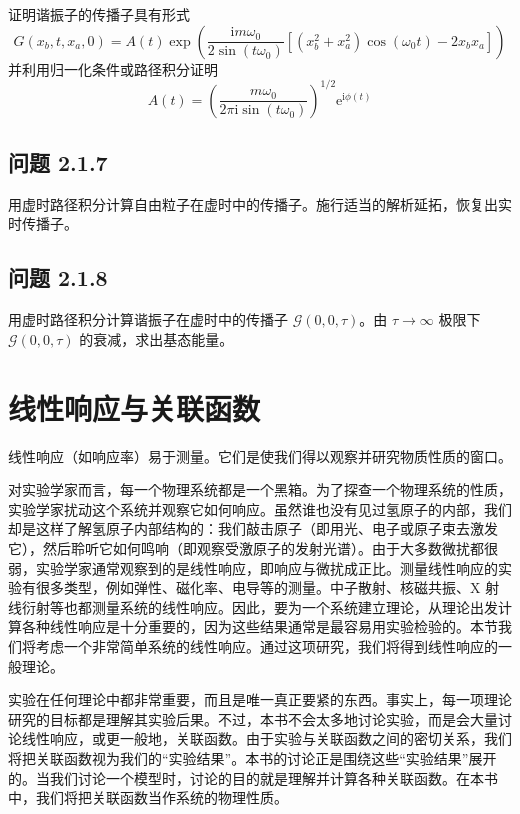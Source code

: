 证明谐振子的传播子具有形式
\begin{equation*}
G(x_b,t,x_a,0)=A(t)\exp\left(\frac{\mathrm{i}m\omega_0}{2\sin(t\omega_0)}\left[(x_b^2+x_a^2)\cos(\omega_0 t)-2x_bx_a\right]\right)
\end{equation*}
并利用归一化条件或路径积分证明
\begin{equation*}
A(t)=\left(\frac{m\omega_0}{2\pi\mathrm{i}\sin(t\omega_0)}\right)^{1/2}\mathrm{e}^{\mathrm{i}\phi(t)}
\end{equation*}

\subsection*{问题 2.1.7}

用虚时路径积分计算自由粒子在虚时中的传播子。施行适当的解析延拓，恢复出实时传播子。

\subsection*{问题 2.1.8}

用虚时路径积分计算谐振子在虚时中的传播子 $\mathcal{G}(0,0,\tau)$。由 $\tau\to\infty$ 极限下 $\mathcal{G}(0,0,\tau)$ 的衰减，求出基态能量。

\section{线性响应与关联函数}

\begin{keypoints}
\item 线性响应（如响应率）易于测量。它们是使我们得以观察并研究物质性质的窗口。
\end{keypoints}

对实验学家而言，每一个物理系统都是一个黑箱。为了探查一个物理系统的性质，实验学家扰动这个系统并观察它如何响应。虽然谁也没有见过氢原子的内部，我们却是这样了解氢原子内部结构的：我们敲击原子（即用光、电子或原子束去激发它），然后聆听它如何鸣响（即观察受激原子的发射光谱）。由于大多数微扰都很弱，实验学家通常观察到的是线性响应，即响应与微扰成正比。测量线性响应的实验有很多类型，例如弹性、磁化率、电导等的测量。中子散射、核磁共振、X 射线衍射等也都测量系统的线性响应。因此，要为一个系统建立理论，从理论出发计算各种线性响应是十分重要的，因为这些结果通常是最容易用实验检验的。本节我们将考虑一个非常简单系统的线性响应。通过这项研究，我们将得到线性响应的一般理论。

实验在任何理论中都非常重要，而且是唯一真正要紧的东西。事实上，每一项理论研究的目标都是理解其实验后果。不过，本书不会太多地讨论实验，而是会大量讨论线性响应，或更一般地，关联函数。由于实验与关联函数之间的密切关系，我们将把关联函数视为我们的“实验结果”。本书的讨论正是围绕这些“实验结果”展开的。当我们讨论一个模型时，讨论的目的就是理解并计算各种关联函数。在本书中，我们将把关联函数当作系统的物理性质。

